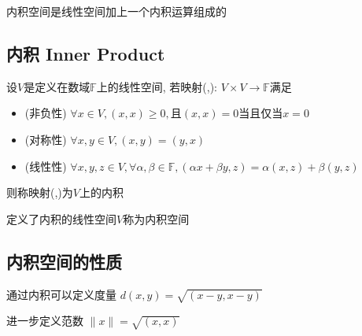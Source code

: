 \begin{Chinese Note}
    内积空间是线性空间加上一个内积运算组成的
\end{Chinese Note}

\subsection{内积 Inner Product}
\begin{tcolorbox}
    [colback=Emerald!10,colframe=cyan!40!black,title=\textbf{内积}]
    设$V$是定义在数域$\mathbb{F}$上的线性空间, 若映射(,): $V\times V \rightarrow \mathbb{F}$满足
    \begin{itemize}
        \item (非负性) $\forall x\in V,(x,x)\geq 0,且(x,x)=0当且仅当x=0$
        \item (对称性) $\forall x,y\in V,(x,y)=(y,x)$
        \item (线性性) $\forall x,y,z\in V,\forall \alpha,\beta\in\mathbb{F},(\alpha x+\beta y,z)=\alpha(x,z)+\beta(y,z)$
    \end{itemize}
    则称映射(,)为$V$上的内积
\end{tcolorbox}
定义了内积的线性空间$V$称为内积空间

\subsection{内积空间的性质}
通过内积可以定义度量 $d(x,y)=\sqrt{(x-y,x-y)}$

进一步定义范数 $\|x\|=\sqrt{(x,x)}$